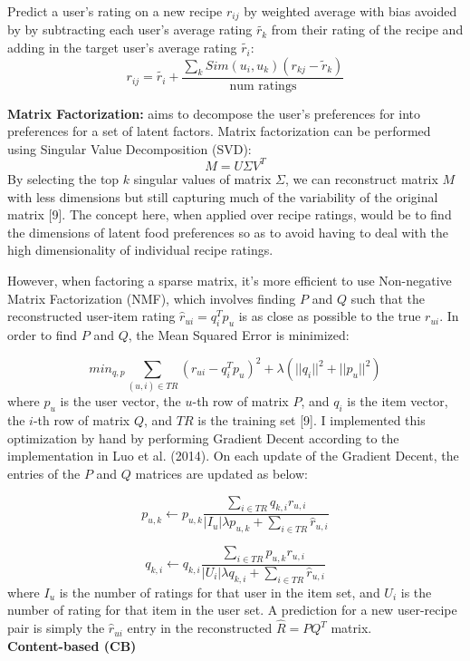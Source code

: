 \documentclass{article}
\begin{document}
Predict a user's rating on a new recipe $r_{ij}$ by weighted average with bias avoided by by subtracting each user's average rating $\tilde{r_k}$ from their rating of the recipe and adding in the target user's average rating $\tilde{r_i}$:
\begin{equation}
    r_{ij} = \tilde{r_i}+\frac{\sum_kSim(u_i, u_k)(r_{kj}-\tilde{r}_k)}{\text{num ratings}}
\end{equation}
\vspace{0.1in}

\textbf{Matrix Factorization:} aims to decompose the user's preferences for into preferences for a set of latent factors. Matrix factorization can be performed using Singular Value Decomposition (SVD): 
\begin{equation}
   M = U\Sigma V^T
\end{equation} By selecting the top $k$ singular values of matrix $\Sigma$, we can reconstruct matrix $M$ with less dimensions but still capturing much of the variability of the original matrix [9]. The concept here, when applied over recipe ratings, would be to find the dimensions of latent food preferences so as to avoid having to deal with the high dimensionality of individual recipe ratings.

However, when factoring a sparse matrix, it's more efficient to use Non-negative Matrix Factorization (NMF), which involves finding  $P$ and $Q$ such that the reconstructed user-item rating $\hat{r}_{ui}= q_i^Tp_u$ is as close as possible to the true ${r}_{ui}$. In order to find $P$ and $Q$, the Mean Squared Error is minimized:

\begin{equation}
   min_{q,p} \sum_{(u, i) \in TR} (r_{ui} - q_i^Tp_u)^2 + \lambda(||q_i||^2+||p_u||^2)
\end{equation} where $p_u$ is the user vector, the $u$-th row of matrix $P$, and $q_i$ is the item vector, the $i$-th row of matrix $Q$, and $TR$ is the training set [9]. I implemented this optimization by hand by performing Gradient Decent according to the implementation in Luo et al. (2014). On each update of the Gradient Decent, the entries of the $P$ and $Q$ matrices are updated as below:

\begin{equation}
   p_{u,k} \leftarrow p_{u,k}\frac{\sum_{i \in TR}q_{k,i} r_{u,i}}{|I_u|\lambda p_{u,k} + \sum_{i \in TR} \hat r_{u,i}}
\end{equation}

\begin{equation}
    q_{k,i} \leftarrow q_{k,i}\frac{\sum_{i \in TR}p_{u,k} r_{u,i}}{|U_i|\lambda q_{k,i} + \sum_{i \in TR} \hat r_{u,i}}
\end{equation} where $I_u$ is the number of ratings for that user in the item set, and $U_i$ is the number of rating for that item in the user set. A prediction for a new user-recipe pair is simply the $\hat r_{ui}$ entry in the reconstructed $\hat R = PQ^T$ matrix.
\vspace{0.1in}
\\
\textbf{Content-based (CB)} 
\end{document}
